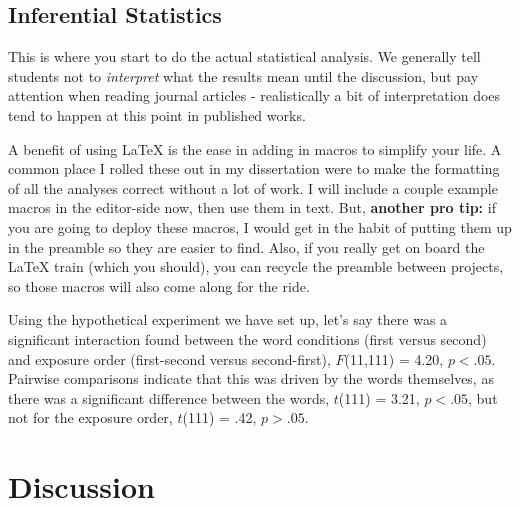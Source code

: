 \documentclass[stu,12pt,floatsintext,justification]{apa7_ula}
\begin{document}
\subsection{Inferential Statistics}

This is where you start to do the actual statistical analysis. We generally
tell students not to \textit{interpret} what the results mean until the
discussion, but pay attention when reading journal articles - realistically a
bit of interpretation does tend to happen at this point in published works.

A benefit of using \LaTeX{} is the ease in adding in macros to simplify your
life. A common place I rolled these out in my dissertation were to make the
formatting of all the analyses correct without a lot of work. I will include a
couple example macros in the editor-side now, then use them in text. But,
\textbf{another pro tip:} if you are going to deploy these macros, I would get
in the habit of putting them up in the preamble so they are easier to find.
Also, if you really get on board the \LaTeX{} train (which you should), you can
recycle the preamble between projects, so those macros will also come along for
the ride.

\newcommand{\ttestSig}[2]{$t$(#1) = #2, $p < .05$}
\newcommand{\ttestInsig}[2]{$t$(#1) = #2, $p > .05$}
\newcommand{\anovaSig}[3]{$F$(#1,#2) = #3, $p < .05$}
\newcommand{\anovaInsig}[3]{$F$(#1,#2) = #3, $p > .05$}

Using the hypothetical experiment we have set up, let's say there was a
significant interaction found between the word conditions (first versus second)
and exposure order (first-second versus second-first),
\anovaSig{11}{111}{4.20}. Pairwise comparisons indicate that this was driven by
the words themselves, as there was a significant difference between the words,
\ttestSig{111}{3.21}, but not for the exposure order, \ttestInsig{111}{.42}.

\section{Discussion}
\end{document}
